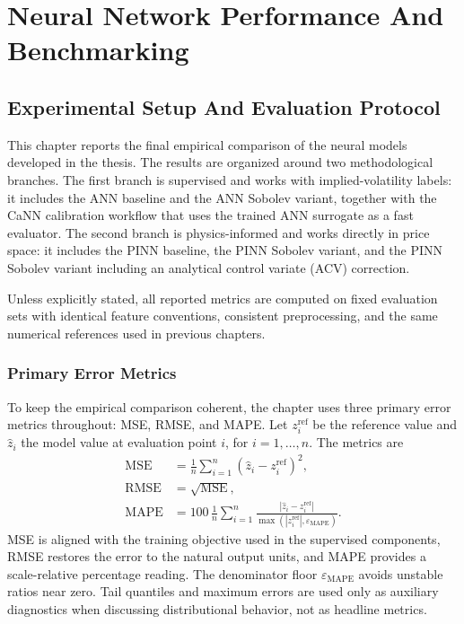 \chapter{Neural Network Performance And Benchmarking}
\label{ch:performance_benchmarks}

\section{Experimental Setup And Evaluation Protocol}
\label{sec:benchmark_protocol}
This chapter reports the final empirical comparison of the neural models developed in the thesis. The results are organized around two methodological branches. The first branch is supervised and works with implied-volatility labels: it includes the ANN baseline and the ANN Sobolev variant, together with the CaNN calibration workflow that uses the trained ANN surrogate as a fast evaluator. The second branch is physics-informed and works directly in price space: it includes the PINN baseline, the PINN Sobolev variant, and the PINN Sobolev variant including an analytical control variate (ACV) correction.

Unless explicitly stated, all reported metrics are computed on fixed evaluation sets with identical feature conventions, consistent preprocessing, and the same numerical references used in previous chapters.

\subsection{Primary Error Metrics}
\label{sec:benchmark_error_metrics}

To keep the empirical comparison coherent, the chapter uses three primary error metrics throughout: MSE, RMSE, and MAPE. Let \(z_i^{\mathrm{ref}}\) be the reference value and \(\hat z_i\) the model value at evaluation point \(i\), for \(i=1,\ldots,n\). The metrics are
\begin{equation}
    \begin{aligned}
    \mathrm{MSE}
        &=\frac{1}{n}\sum_{i=1}^{n}\left(\hat z_i-z_i^{\mathrm{ref}}\right)^2,\\
    \mathrm{RMSE}
        &=\sqrt{\mathrm{MSE}},\\
    \mathrm{MAPE}
        &=100\,\frac{1}{n}\sum_{i=1}^{n}
        \frac{\left|\hat z_i-z_i^{\mathrm{ref}}\right|}
        {\max\left(\left|z_i^{\mathrm{ref}}\right|,\varepsilon_{\mathrm{MAPE}}\right)}.
    \end{aligned}
\end{equation}
MSE is aligned with the training objective used in the supervised components, RMSE restores the error to the natural output units, and MAPE provides a scale-relative percentage reading. The denominator floor \(\varepsilon_{\mathrm{MAPE}}\) avoids unstable ratios near zero. Tail quantiles and maximum errors are used only as auxiliary diagnostics when discussing distributional behavior, not as headline metrics.

